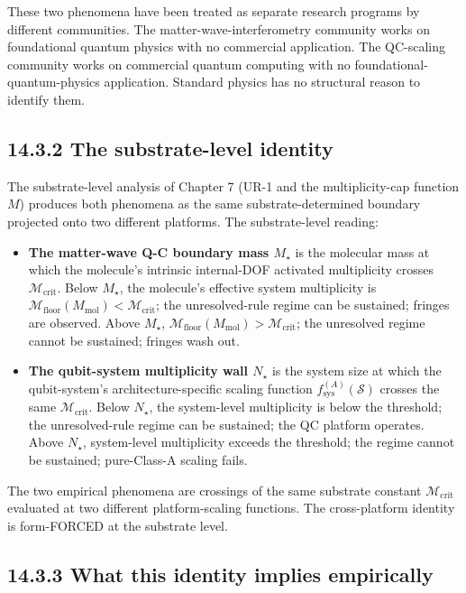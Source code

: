 \documentclass[11pt]{book}
\begin{document}
These two phenomena have been treated as separate research programs by different communities. The matter-wave-interferometry community works on foundational quantum physics with no commercial application. The QC-scaling community works on commercial quantum computing with no foundational-quantum-physics application. Standard physics has no structural reason to identify them.

\subsection{14.3.2 The substrate-level identity}

The substrate-level analysis of Chapter 7 (UR-1 and the multiplicity-cap function $M$) produces both phenomena as the same substrate-determined boundary projected onto two different platforms. The substrate-level reading:

\begin{itemize}
\item \textbf{The matter-wave Q-C boundary mass $M_\star$} is the molecular mass at which the molecule's intrinsic internal-DOF activated multiplicity crosses $\mathcal{M}_\mathrm{crit}$. Below $M_\star$, the molecule's effective system multiplicity is $\mathcal{M}_\mathrm{floor}(M_\mathrm{mol}) < \mathcal{M}_\mathrm{crit}$; the unresolved-rule regime can be sustained; fringes are observed. Above $M_\star$, $\mathcal{M}_\mathrm{floor}(M_\mathrm{mol}) > \mathcal{M}_\mathrm{crit}$; the unresolved regime cannot be sustained; fringes wash out.
\item \textbf{The qubit-system multiplicity wall $N_\star$} is the system size at which the qubit-system's architecture-specific scaling function $f_\mathrm{sys}^{(A)}(\mathcal{S})$ crosses the same $\mathcal{M}_\mathrm{crit}$. Below $N_\star$, the system-level multiplicity is below the threshold; the unresolved-rule regime can be sustained; the QC platform operates. Above $N_\star$, system-level multiplicity exceeds the threshold; the regime cannot be sustained; pure-Class-A scaling fails.
\end{itemize}

The two empirical phenomena are crossings of the same substrate constant $\mathcal{M}_\mathrm{crit}$ evaluated at two different platform-scaling functions. The cross-platform identity is form-FORCED at the substrate level.

\subsection{14.3.3 What this identity implies empirically}
\end{document}

